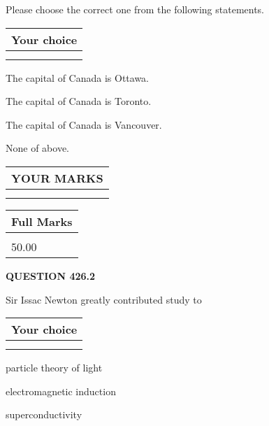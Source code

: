 \documentclass[12pt]{article}
\begin{document}
  
Please choose the correct one from the following statements.
  
  
\noindent\hspace{3.0in} \begin{tabular}{|l|}
\hline
Your choice \\
\hline
 \\ 
 \\ 
\hline
\end{tabular}
  
  
 
 
The capital of Canada is Ottawa.
 
 
The capital of Canada is Toronto.
 
 
The capital of Canada is Vancouver.
 
 
 None of above.
 
 
  
\vspace{0.2in}
  
\noindent\begin{tabular}{|l|}
\hline
 YOUR MARKS  \\
\hline
 \\ 
 \\ 
\hline
\end{tabular}
\hspace{0.05in} \begin{tabular}{|l|}
\hline
 Full Marks  \\
\hline
 \\ 
50.00 \\
\hline
\end{tabular}
{\textbf{\Large{QUESTION
426.2 
}}}
  
  
Sir Issac Newton greatly contributed study to
  
  
\noindent\hspace{3.0in} \begin{tabular}{|l|}
\hline
Your choice \\
\hline
 \\ 
 \\ 
\hline
\end{tabular}
  
  
 
 
particle theory of light
 
 
electromagnetic induction
 
 
superconductivity
 
\end{document}
